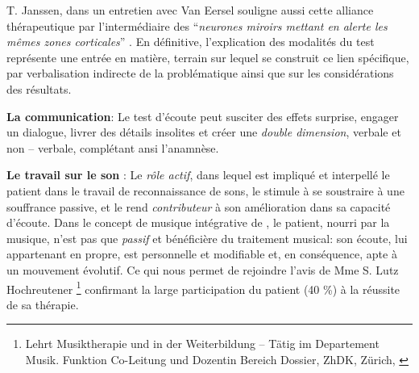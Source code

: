 T. Janssen, dans un entretien
avec Van Eersel
souligne aussi cette alliance thérapeutique
par l'intermédiaire des ``\textit{neurones
 miroirs mettant en alerte les mêmes zones corticales}'' \autocite[203]{van_eersel_cerveau}.
En définitive, l'explication des modalités du test représente une
  entrée en matière, terrain  sur lequel se construit ce lien spécifique,
  par verbalisation indirecte de la problématique ainsi que sur
  les considérations des résultats.





\textbf{La communication}:
  Le test d'écoute
  peut susciter des effets surprise, engager un dialogue, livrer des détails
 insolites et créer une \textit{double dimension}, verbale et
 non -- verbale, complétant ansi l'anamnèse.



 \textbf{Le travail sur le son} :
 Le \emph{rôle actif}, dans lequel est impliqué et interpellé le patient dans le travail
de reconnaissance de sons, le stimule à se soustraire à une souffrance
passive, et  le rend  \textit{contributeur} à son amélioration dans sa capacité
d'écoute.
Dans le concept de musique intégrative de \autocite[Cf.]
        {vrait_musicotherapie_2018}, le patient, nourri par
        la musique, n'est pas que \textit{passif }et
        bénéficière du traitement musical: son écoute, lui
        appartenant en propre, est personnelle et modifiable %
        et, en conséquence, apte à un mouvement évolutif.
Ce qui nous permet de rejoindre l'avis de Mme S. Lutz
 Hochreutener \footnote{ Lehrt Musiktherapie und in der Weiterbildung – Tätig
 im Departement Musik. Funktion Co-Leitung und Dozentin Bereich
  Dossier, ZhDK, Zürich, \autocite {lutz_hochreutener_spiel_2009} }
 confirmant la large participation du patient (40 \%) à la réussite de sa thérapie.




